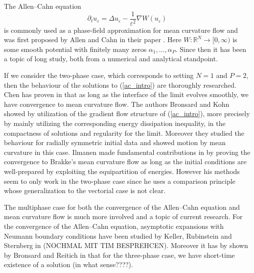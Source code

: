 The Allen--Cahn equation
\begin{equation}
	\label{ac_intro}
	\partial_{ t } u_{ \varepsilon }
	=
	\Delta u_{ \varepsilon }
	-
	\frac{ 1 }{ \varepsilon^{ 2 } }
	\nabla W ( u_{ \varepsilon } )
\end{equation}
is commonly used as a phase-field approximation for mean curvature flow and was 
first proposed by Allen and Cahn in their paper 
\cite{allen_cahn_microscopig_theory_for_antiphase_boundary_motion}. Here $ W 
\colon \mathbb{ R }^{ N } \to [ 0 , \infty ) $ is some smooth potential with 
finitely many zeros $ \alpha_{ 1 } , \dotsc, \alpha_{ P } $.
Since then it has been a topic of long study, both from a numerical and 
analytical standpoint. 

If we consider the two-phase case, which corresponds to setting $ N = 1 $ and $ 
P = 2 $, then 
the behaviour of the solutions to (\ref{ac_intro}) are thoroughly researched.
Chen has proven in 
\cite{chen_generation_and_propagation_of_interfaces_for_reaction_diffusion_equations}
that as long as the interface of the limit evolves smoothly, we have 
convergence to mean curvature flow.
The authors Bronsard and Kohn showed by utilization of the gradient flow 
structure of (\ref{ac_intro}), more precisely by mainly utilizing the 
corresponding energy dissipation inequality, in 
\cite{bronsard_kohn_motion_by_mean_curvature_as_singular_limit} the compactness 
of solutions and regularity for the limit. Moreover they studied the behaviour 
for radially symmetric initial data and showed motion by mean curvature in this 
case. 
Ilmanen made fundamental contributions in 
\cite{ilmanen_convergence_of_ac_to_brakkes_mcf} by proving the convergence to 
Brakke's mean curvature flow as long as the initial conditions are 
well-prepared by exploiting the equipartition of energies. However his methods 
seem to only work in the two-phase case since he uses a comparison principle 
whose generalization to the vectorial case is not clear.

The multiphase case for both the convergence of the Allen--Cahn equation and 
mean 
curvature flow is much more involved and a topic of current research. For the 
convergence of the Allen--Cahn equation, asymptotic expansions  with Neumann 
boundary conditions 
have been studied by Keller, Rubinstein and Sternberg in 
\cite{keller_rubinstein_sternberg_fast_reaction_slow_diffusion} (NOCHMAL MIT 
TIM BESPREHCEN). Moreover it has by shown by Bronsard and 
Reitich in 
\cite{bronsard_reitich_on_three_phase_boundary_motion_and_singular_limit} that 
for the three-phase case, we have short-time existence of a solution (in what 
sense????). 

